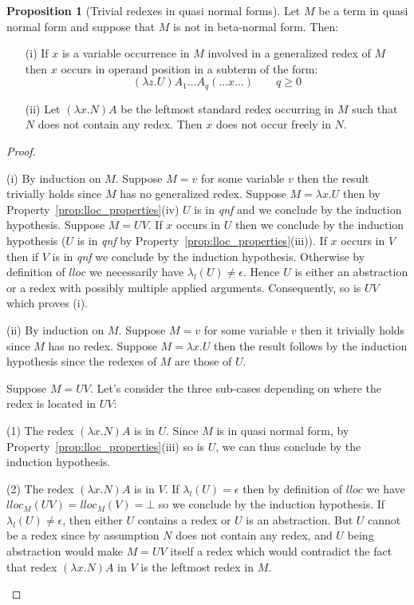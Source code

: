 \documentclass{article}
\theoremstyle{definition}
\newtheorem{proposition}{Proposition}[section]
\begin{document}
\begin{proposition}[Trivial redexes in quasi normal forms]
\label{prop:qnf_nf}
Let $M$ be a term in quasi normal form and suppose that $M$ is not in beta-normal form. Then:
\begin{itemize}
\item[(i)] If $x$ is a variable occurrence in $M$ involved in a generalized redex of $M$ then $x$ occurs in operand position in a subterm of the form:
$$(\lambda z .U) A_1 \ldots A_q (\ldots x \ldots) \qquad q\geq 0$$
\item[(ii)] Let $(\lambda x . N) A$ be the leftmost standard redex occurring in $M$ such that $N$ does not contain any redex. Then $x$ does not occur freely in $N$.
\end{itemize}
\end{proposition}
\begin{proof}
\begin{compactitem}
\item[(i)] By induction on $M$. Suppose $M = v$ for some variable $v$ then the result trivially holds since $M$ has no generalized redex. Suppose $M = \lambda x . U$ then by Property~\ref{prop:lloc_properties}(iv) $U$ is in \emph{qnf} and we conclude by the induction hypothesis.
    Suppose $M = U V$. If $x$ occurs in $U$ then we conclude by the induction hypothesis ($U$ is in \emph{qnf} by Property~\ref{prop:lloc_properties}(iii)). If $x$ occurs in $V$ then if $V$ is in \emph{qnf} we conclude by the induction hypothesis. Otherwise by definition of $lloc$ we necessarily have $\lambda_l(U) \neq \epsilon$. Hence $U$ is either an abstraction or a redex with possibly multiple applied arguments. Consequently, so is $UV$ which proves (i).

\item[(ii)] By induction on $M$. Suppose $M = v$ for some variable $v$ then it trivially holds since $M$ has no redex. Suppose $M = \lambda x . U$ then the result follows by the induction hypothesis since the redexes of $M$ are those of $U$.

Suppose $M = U V$. Let's consider the three sub-cases depending on where the redex is located in $U V$:
\begin{compactitem}
  \item[(1)] The redex $(\lambda x . N) A$  is in $U$. Since $M$ is in quasi normal form, by Property~\ref{prop:lloc_properties}(iii) so is $U$, we can thus conclude by the induction hypothesis.

  \item[(2)] The redex $(\lambda x . N) A$  is in $V$.
If $\lambda_l(U) = \epsilon$ then by definition of $lloc$ we have $lloc_M(UV) = lloc_M(V) = \bot$ so we conclude by the induction hypothesis.
If $\lambda_l(U) \neq \epsilon$, then either $U$ contains a redex or $U$ is an abstraction. But $U$ cannot be a redex since by assumption $N$ does not contain any redex, and $U$ being abstraction would make $M = U V$ itself a redex which would contradict the fact that redex $(\lambda x . N) A$ in $V$ is the leftmost redex in $M$.


\end{compactitem}
\end{compactitem}
\end{proof}
\end{document}
